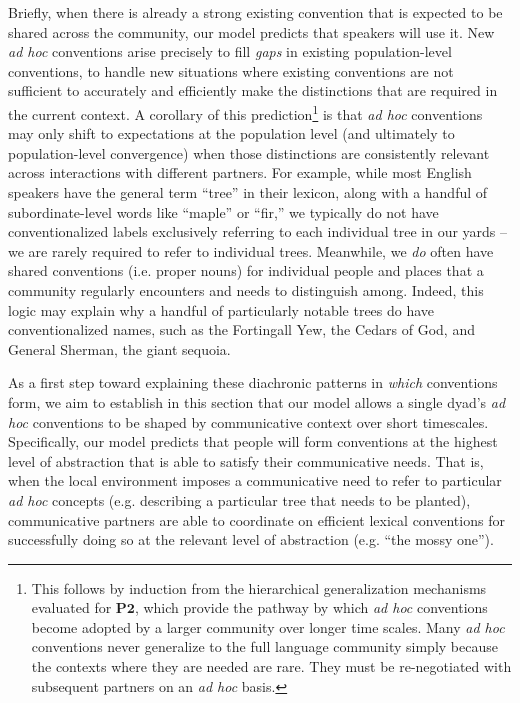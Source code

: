 Briefly, when there is already a strong existing convention that is expected to be shared across the community, our model predicts that speakers will use it. 
New \emph{ad hoc} conventions arise precisely to fill \emph{gaps} in existing population-level conventions, to handle new situations where existing conventions are not sufficient to accurately and efficiently make the distinctions that are required in the current context. 
A corollary of this prediction\footnote{This follows by induction from the hierarchical generalization mechanisms evaluated for $\textbf{P2}$, which provide the pathway by which \emph{ad hoc} conventions become adopted by a larger community over longer time scales. Many \emph{ad hoc} conventions never generalize to the full language community simply because the contexts where they are needed are rare. They must be re-negotiated with subsequent partners on an \emph{ad hoc} basis.} is that \emph{ad hoc} conventions may only shift to expectations at the population level (and ultimately to population-level convergence) when those distinctions are consistently relevant across interactions with different partners.
For example, while most English speakers have the general term  ``tree'' in their lexicon, along with a handful of subordinate-level words like ``maple'' or ``fir,'' we typically do not have conventionalized labels exclusively referring to each individual tree in our yards -- we are rarely required to refer to individual trees.
Meanwhile, we \emph{do} often have shared conventions (i.e. proper nouns) for individual people and places that a community regularly encounters and needs to distinguish among.
Indeed, this logic may explain why a handful of particularly notable trees do have conventionalized names, such as the Fortingall Yew, the Cedars of God, and General Sherman, the giant sequoia.


As a first step toward explaining these diachronic patterns in \emph{which} conventions form, we aim to establish in this section that our model allows a single dyad's \emph{ad hoc} conventions to be shaped by communicative context over short timescales.
Specifically, our model predicts that people will form conventions at the highest level of abstraction that is able to satisfy their communicative needs.
That is, when the local environment imposes a communicative need to refer to particular \emph{ad hoc} concepts (e.g. describing a particular tree that needs to be planted), communicative partners are able to coordinate on efficient lexical conventions for successfully doing so at the relevant level of abstraction (e.g. ``the mossy one'').

